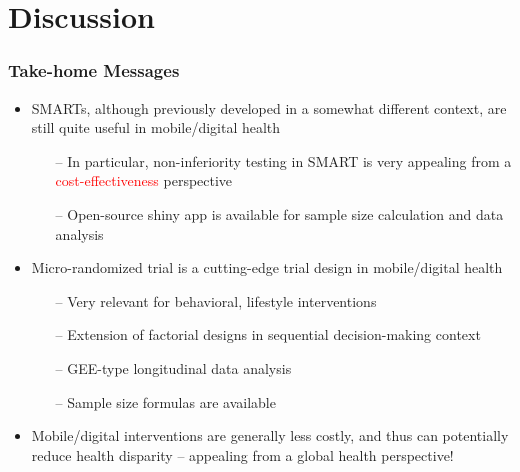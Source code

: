 \documentclass[10pt,xcolor=dvipsnames]{beamer}
\begin{document}
\section{Discussion}

\begin{frame}%
\frametitle{Take-home Messages}
\begin{itemize}
\item SMARTs, although previously developed in a somewhat different context, are still quite useful in mobile/digital health
\smallskip
\begin{itemize}
\item[--] In particular, non-inferiority testing in SMART is very appealing from a \textcolor{red}{cost-effectiveness} perspective
\smallskip
\item[--] Open-source shiny app is available for sample size calculation and data analysis
\end{itemize}
\bigskip
\item Micro-randomized trial is a cutting-edge trial design in mobile/digital health
\smallskip
\begin{itemize}
\item[--] Very relevant for behavioral, lifestyle interventions
\smallskip
\item[--] Extension of factorial designs in sequential decision-making context
\smallskip 
\item[--] GEE-type longitudinal data analysis
\smallskip
\item[--] Sample size formulas are available 
\end{itemize}
\bigskip
\item Mobile/digital interventions are generally less costly, and thus can potentially reduce \alert{health disparity} -- appealing from a \alert{global health} perspective!
\end{itemize}
\end{frame}
\end{document}
